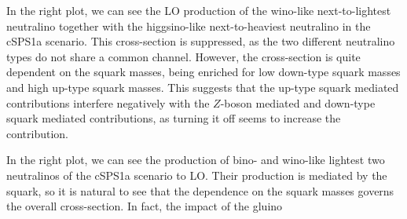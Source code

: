 \documentclass[../main.tex]{subfiles}
\begin{document}
In the right plot, we can see the LO production of the wino-like next-to-lightest neutralino together with the higgsino-like next-to-heaviest neutralino in the cSPS1a scenario.
This cross-section is suppressed, as the two different neutralino types do not share a common channel.
However, the cross-section is quite dependent on the squark masses, being enriched for low down-type squark masses and high up-type squark masses.
This suggests that the up-type squark mediated contributions interfere negatively with the \(Z\)-boson mediated and down-type squark mediated contributions, as turning it off seems to increase the contribution.

In the right plot, we can see the production of bino- and wino-like lightest two neutralinos of the cSPS1a scenario to LO\@.
Their production is mediated by the squark, so it is natural to see that the dependence on the squark masses governs the overall cross-section.
In fact, the impact of the gluino

\ifSubfilesClassLoaded{%
  {}
  
}{}
\end{document}
